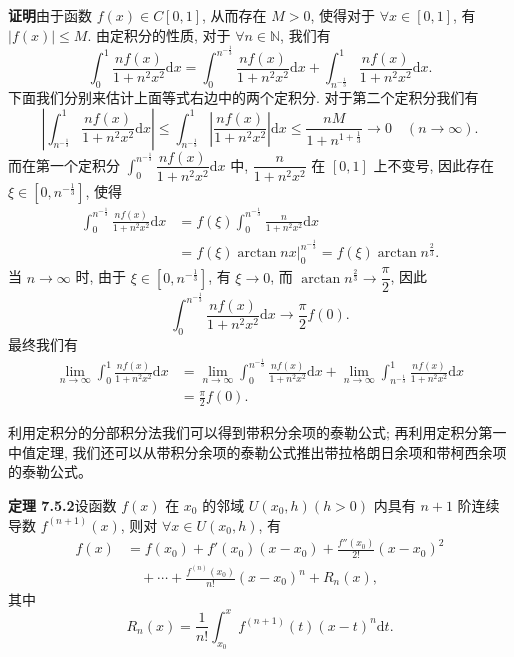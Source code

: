\documentclass[UTF8,12pt,a4paper,fontset=fandol]{ctexart}
\begin{document}
\noindent\textbf{证明}\quad 由于函数 $f(x)\in C[0,1]$, 从而存在 $M>0$, 使得对于 $\forall x\in[0,1]$, 有 $|f(x)|\leq M$. 由定积分的性质, 对于 $\forall n\in\mathbb N$, 我们有
\[
  \int_0^1\frac{nf(x)}{1+n^2x^2}\mathrm dx
  =\int_0^{n^{-\frac13}}\frac{nf(x)}{1+n^2x^2}\mathrm dx
  +\int_{n^{-\frac13}}^1\frac{nf(x)}{1+n^2x^2}\mathrm dx.
\]
下面我们分别来估计上面等式右边中的两个定积分. 对于第二个定积分我们有
\[
  \left|\int_{n^{-\frac13}}^1\frac{nf(x)}{1+n^2x^2}\mathrm dx\right|
  \leq\int_{n^{-\frac13}}^1\left|\frac{nf(x)}{1+n^2x^2}\right|\mathrm dx
  \leq\frac{nM}{1+n^{1+\frac13}}\to0\quad(n\to\infty).
\]
而在第一个定积分 $\int_0^{n^{-\frac13}}\dfrac{nf(x)}{1+n^2x^2}\mathrm dx$ 中, $\dfrac{n}{1+n^2x^2}$ 在 $[0,1]$ 上不变号, 因此存在 $\xi\in[0,n^{-\frac13}]$, 使得
\[
\begin{aligned}
  \int_0^{n^{-\frac13}}\frac{nf(x)}{1+n^2x^2}\mathrm dx
  &=f(\xi)\int_0^{n^{-\frac13}}\frac{n}{1+n^2x^2}\mathrm dx\\
  &=\left.f(\xi)\arctan nx\right|_0^{n^{-\frac13}}
  =f(\xi)\arctan n^{\frac23}.
\end{aligned}
\]
当 $n\to\infty$ 时, 由于 $\xi\in[0,n^{-\frac13}]$, 有 $\xi\to0$, 而 $\arctan n^{\frac23}\to\dfrac{\pi}{2}$, 因此
\[
  \int_0^{n^{-\frac13}}\frac{nf(x)}{1+n^2x^2}\mathrm dx\to\frac{\pi}{2}f(0).
\]
最终我们有
\[
\begin{aligned}
  \lim_{n\to\infty}\int_0^1\frac{nf(x)}{1+n^2x^2}\mathrm dx
  &=\lim_{n\to\infty}\int_0^{n^{-\frac13}}\frac{nf(x)}{1+n^2x^2}\mathrm dx
  +\lim_{n\to\infty}\int_{n^{-\frac13}}^1\frac{nf(x)}{1+n^2x^2}\mathrm dx\\
  &=\frac{\pi}{2}f(0).
\end{aligned}
\]

利用定积分的分部积分法我们可以得到带积分余项的泰勒公式; 再利用定积分第一中值定理, 我们还可以从带积分余项的泰勒公式推出带拉格朗日余项和带柯西余项的泰勒公式。

\noindent\textbf{定理 7.5.2}\quad 设函数 $f(x)$ 在 $x_0$ 的邻域 $U(x_0,h)(h>0)$ 内具有 $n+1$ 阶连续导数 $f^{(n+1)}(x)$, 则对 $\forall x\in U(x_0,h)$, 有
\begin{equation}
\begin{aligned}
  f(x)&=f(x_0)+f'(x_0)(x-x_0)+\frac{f''(x_0)}{2!}(x-x_0)^2\\
  &\quad+\cdots+\frac{f^{(n)}(x_0)}{n!}(x-x_0)^n+R_n(x),
\end{aligned}
\tag{7.5.1}
\end{equation}
其中
\[
  R_n(x)=\frac{1}{n!}\int_{x_0}^x f^{(n+1)}(t)(x-t)^n\mathrm dt.
\]
\end{document}
